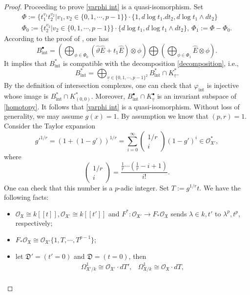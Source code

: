 \documentclass[12pt, a4paper]{article}
\begin{document}
\begin{proof}
Proceeding to prove \eqref{varphi int} is a quasi-isomorphism. Set
$$
\begin{array}{c}
\Phi:=\{t_1^{v_1}t_2^{v_2}|v_1,v_2\in\{0,1,\cdots,p-1\}\}\cdot\{1,d\log t_1.dt_2,d\log t_1\wedge dt_2\}\\
\Phi_0:=\{t_2^{v_2}|v_2\in\{0,1,\cdots,p-1\}\}\cdot\{d\log t_1,d\log t_1\wedge dt_2\},~\Phi_1:=\Phi-\Phi_0.
\end{array}
$$
According to the proof of \cite[Lemma 3.14]{SZ2}, one has
$$
B^\bullet_\mathrm{int}=(\bigoplus_{\phi\in\Phi_0}(\hat\vartheta\hat E+t_1\hat E)\otimes\phi)\bigoplus(\bigoplus_{\phi\in\Phi_1}\hat E\otimes\phi).
$$
It implies that $B^*_\mathrm{int}$ is compatible with the decomposition \eqref{decomposition}, i.e.,
$$
B_\mathrm{int}^*=\bigoplus_{\underline v\in\{0,1,\cdots,p-1\}^2}B^*_\mathrm{int}\cap K^*_{\underline v}.
$$
By the definition of intersection complexes, one can check that $\varphi_\mathrm{int}$ is injective whose image is $B^*_\mathrm{int}\cap K^*_{(0,0)}$. Moreover, $B^\bullet_\mathrm{int}\cap K^\bullet_{\underline v}$  is an invariant subspace of \eqref{homotopy}. It follows that \eqref{varphi int} is a quasi-isomorphism.
\iffalse
Without loss of generality, we may assume $g(x)=1$. By assumption we know that $(p,r)=1$. Consider the Taylor expansion
$$
g'^{1/r}=(1+(1-g'))^{1/r}=\sum_{i=0}^\infty\left(\begin{matrix}
1/r\\
i
\end{matrix}
\right)(1-g')^i\in\mathcal O^*_{\mathfrak X'},
$$
where
$$
\left(\begin{matrix}
1/r\\
i
\end{matrix}
\right)=\frac{\frac{1}{r}\cdots(\frac{1}{r}-i+1)}{i!}.
$$
One can check that this number is a $p$-adic integer. Set $T:=g^{1/r}t$. We have the following facts:
\begin{itemize}
\item[(i)\ ] $\mathcal O_{\mathfrak X}\cong k[[t]],\mathcal O_{\mathfrak X'}\cong k[[t']]$ and $F^*:\mathcal O_{\mathfrak X'}\to F_*\mathcal O_{\mathfrak X}$ sends $\lambda\in k,t'$ to $\lambda^p,t^p$, respectively;
\item[(ii)\ ] $F_*\mathcal O_{\mathfrak X}\cong\mathcal O_{\mathfrak X'}\{1,T,\cdots,T^{p-1}\}$;
\item[(iii)\ ] let $\mathfrak D'=(t'=0)$ and $\mathfrak D=(t=0)$, then
$$
\begin{array}{rl}
\Omega^1_{\mathfrak X'/k}\cong\mathcal O_{\mathfrak X'}\cdot dT',&\Omega^1_{\mathfrak X/k}\cong\mathcal O_{\mathfrak X}\cdot dT,\\

\end{array}$$
\end{itemize}
\end{proof}
\end{document}
